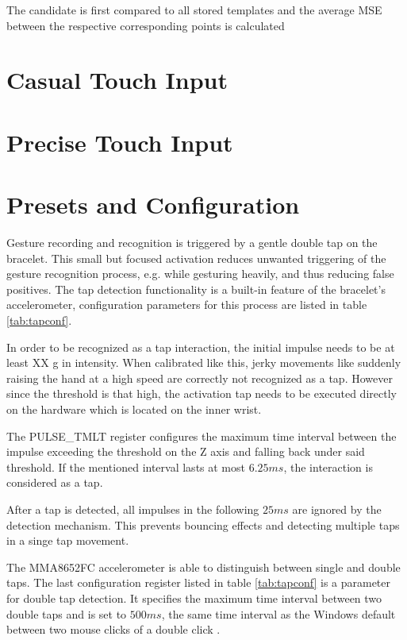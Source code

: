 The candidate is first compared to all stored templates and the average \ac{MSE} between the respective corresponding points is calculated

\section{Casual Touch Input}

\section{Precise Touch Input}

\section{Presets and Configuration}

Gesture recording and recognition is triggered by a gentle double tap on the bracelet. This small but focused activation reduces unwanted triggering of the gesture recognition process, e.g. while gesturing heavily, and thus reducing false positives. The tap detection functionality is a built-in feature of the bracelet's accelerometer, configuration parameters for this process are listed in table \ref{tab:tapconf}.

In order to be recognized as a tap interaction, the initial impulse needs to be at least XX g in intensity. When calibrated like this, jerky movements like suddenly raising the hand at a high speed are correctly not recognized as a tap. However since the threshold is that high, the activation tap needs to be executed directly on the hardware which is located on the inner wrist.

The PULSE\_TMLT register configures the maximum time interval between the  impulse exceeding the threshold on the Z axis and falling back under said threshold. If the mentioned interval lasts at most $6.25 ms$, the interaction is considered as a tap.

After a tap is detected, all impulses in the following $25ms$ are ignored by the detection mechanism. This prevents bouncing effects and detecting multiple taps in a singe tap movement.

The MMA8652FC accelerometer is able to distinguish between single and double taps. The last configuration register listed in table \ref{tab:tapconf} is a parameter for double tap detection. It specifies the maximum time interval between two double taps and is set to $500 ms$, the same time interval as the Windows default between two mouse clicks of a double click \cite{doubleclick}.

